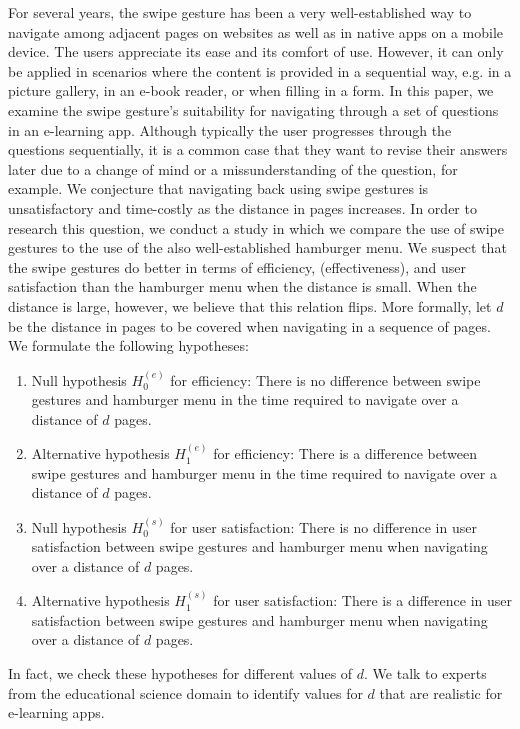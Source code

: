 \documentclass{sig-alternate-05-2015}
\begin{document}
For several years, the swipe gesture has been a very well-established way to navigate among adjacent pages on websites as well as in native
apps on a mobile device. The users appreciate its ease and its comfort of use. However, it can only be applied in scenarios where
the content is provided in a sequential way, e.g. in a picture gallery, in an e-book reader, or when filling in a form. In this paper, we
examine the swipe gesture's suitability for navigating through a set of questions in an e-learning app. Although typically the user progresses
through the questions sequentially, it is a common case that they want to revise their answers later due to a change of mind or a missunderstanding
of the question, for example. We conjecture that navigating back using swipe gestures is unsatisfactory and time-costly as the distance in pages
increases. In order to research this question, we conduct a study in which we compare the use of swipe gestures to the use of the also
well-established hamburger menu. We suspect that the swipe gestures do better in terms of efficiency, (effectiveness), and
user satisfaction than the hamburger menu when the distance is small. When the distance is large, however,
we believe that this relation flips. More formally, let $d$ be the distance in pages to be covered when navigating in a sequence of pages.
We formulate the following hypotheses:
\begin{enumerate}
  \item Null hypothesis $H_0^{(e)}$ for efficiency: There is no difference between swipe gestures and hamburger menu in the time required to navigate over a distance of $d$ pages.
  \item Alternative hypothesis $H_1^{(e)}$ for efficiency: There is a difference between swipe gestures and hamburger menu in the time required to navigate over a distance of $d$ pages.
  \item Null hypothesis $H_0^{(s)}$ for user satisfaction: There is no difference in user satisfaction between swipe gestures and hamburger menu when navigating over a distance of $d$ pages.
  \item Alternative hypothesis $H_1^{(s)}$ for user satisfaction: There is a difference in user satisfaction between swipe gestures and hamburger menu when navigating over a distance of $d$ pages.
\end{enumerate}
In fact, we check these hypotheses for different values of $d$. We talk to experts from the educational science domain to identify values for $d$ that are realistic for e-learning apps.
\end{document}
